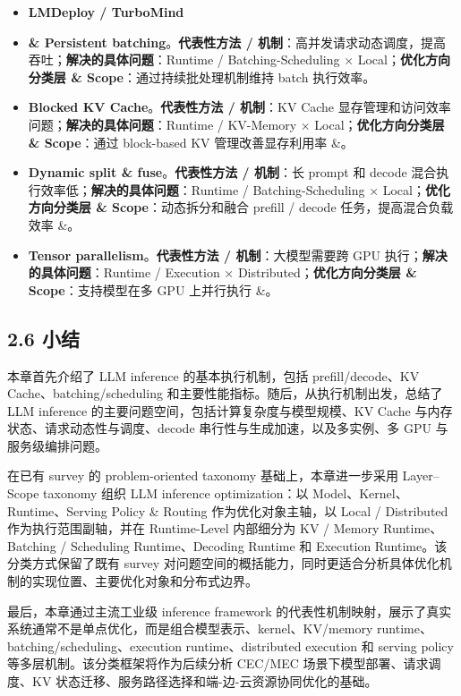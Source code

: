 \documentclass[a4paper,twocolumn,10pt]{ctexart}
\begin{document}
\begin{itemize}
\item \textbf{LMDeploy / TurboMind}
\item \textbf{\& Persistent batching}。\textbf{代表性方法 / 机制}：高并发请求动态调度，提高吞吐；\textbf{解决的具体问题}：Runtime / Batching-Scheduling × Local；\textbf{优化方向分类层 \& Scope}：通过持续批处理机制维持 batch 执行效率。
\item \textbf{Blocked KV Cache}。\textbf{代表性方法 / 机制}：KV Cache 显存管理和访问效率问题；\textbf{解决的具体问题}：Runtime / KV-Memory × Local；\textbf{优化方向分类层 \& Scope}：通过 block-based KV 管理改善显存利用率 \&。
\item \textbf{Dynamic split \& fuse}。\textbf{代表性方法 / 机制}：长 prompt 和 decode 混合执行效率低；\textbf{解决的具体问题}：Runtime / Batching-Scheduling × Local；\textbf{优化方向分类层 \& Scope}：动态拆分和融合 prefill / decode 任务，提高混合负载效率 \&。
\item \textbf{Tensor parallelism}。\textbf{代表性方法 / 机制}：大模型需要跨 GPU 执行；\textbf{解决的具体问题}：Runtime / Execution × Distributed；\textbf{优化方向分类层 \& Scope}：支持模型在多 GPU 上并行执行 \&。
\end{itemize}





\subsection{2.6 小结}

本章首先介绍了 LLM inference 的基本执行机制，包括 prefill/decode、KV Cache、batching/scheduling 和主要性能指标。随后，从执行机制出发，总结了 LLM inference 的主要问题空间，包括计算复杂度与模型规模、KV Cache 与内存状态、请求动态性与调度、decode 串行性与生成加速，以及多实例、多 GPU 与服务级编排问题。


在已有 survey 的 problem-oriented taxonomy 基础上，本章进一步采用 Layer–Scope taxonomy 组织 LLM inference optimization：以 Model、Kernel、Runtime、Serving Policy \& Routing 作为优化对象主轴，以 Local / Distributed 作为执行范围副轴，并在 Runtime-Level 内部细分为 KV / Memory Runtime、Batching / Scheduling Runtime、Decoding Runtime 和 Execution Runtime。该分类方式保留了既有 survey 对问题空间的概括能力，同时更适合分析具体优化机制的实现位置、主要优化对象和分布式边界。


最后，本章通过主流工业级 inference framework 的代表性机制映射，展示了真实系统通常不是单点优化，而是组合模型表示、kernel、KV/memory runtime、batching/scheduling、execution runtime、distributed execution 和 serving policy 等多层机制。该分类框架将作为后续分析 CEC/MEC 场景下模型部署、请求调度、KV 状态迁移、服务路径选择和端-边-云资源协同优化的基础。
\end{document}
